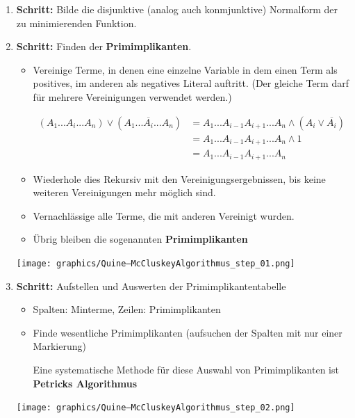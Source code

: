 \documentclass[12pt]{report}
\begin{document}
\begin{enumerate}
  \item \textbf{Schritt:} Bilde die disjunktive (analog auch konmjunktive) Normalform der zu minimierenden Funktion.
  \item \textbf{Schritt:} Finden der \textbf{Primimplikanten}.
        \begin{itemize}
          \item Vereinige Terme, in denen eine einzelne Variable
                in dem einen Term als positives, im anderen als negatives Literal auftritt.
                (Der gleiche Term darf für mehrere Vereinigungen verwendet werden.)
                
                \begin{align*}
                  (A_1 ... A_i ... A_n) \vee (A_1 ... \overline{A_i} ... A_n)
                   & = A_1 ... A_{i-1} A_{i+1} ... A_n \wedge (A_i \vee \overline{A_i})  \\
                   & = A_1 ... A_{i-1} A_{i+1} ... A_n \wedge 1                          \\
                   & = A_1 ... A_{i-1} A_{i+1} ... A_n                                  
                \end{align*}
          \item Wiederhole dies Rekursiv mit den Vereinigungsergebnissen, bis keine weiteren Vereinigungen mehr möglich sind.
          \item Vernachlässige alle Terme, die mit anderen Vereinigt wurden.
          \item Übrig bleiben die sogenannten \textbf{Primimplikanten}
        \end{itemize}
        
        \begin{center}
          \texttt{[image: graphics/Quine–McCluskeyAlgorithmus\_step\_01.png]}
        \end{center}
        
  \item \textbf{Schritt:} Aufstellen und Auswerten der Primimplikantentabelle
        \begin{itemize}
          \item Spalten: Minterme, Zeilen: Primimplikanten
          \item Finde wesentliche Primimplikanten (aufsuchen der Spalten mit nur einer Markierung)
                
                Eine systematische Methode für diese Auswahl von Primimplikanten ist \textbf{Petricks Algorithmus}
        \end{itemize}
        \begin{center}
          \texttt{[image: graphics/Quine–McCluskeyAlgorithmus\_step\_02.png]}
        \end{center}
        

\end{enumerate}
\end{document}

